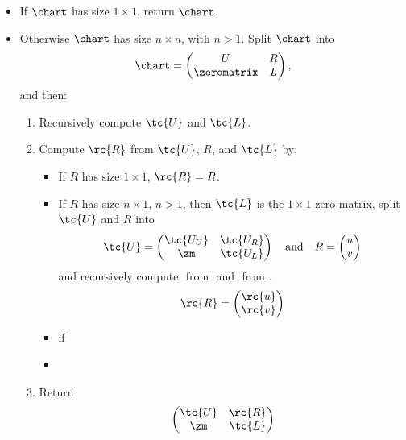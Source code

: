\begin{itemize}
\item If $\chart$ has size $1 \times 1$, return $\chart$.
\item Otherwise $\chart$ has size $n \times n$, with $n > 1$. Split $\chart$ into
  \begin{equation*}
    \chart = 
    \begin{pmatrix}
      U           &  R \\
      \zeromatrix &  L
    \end{pmatrix},
  \end{equation*}
  and then: 
  \begin{enumerate}
  \item Recursively compute $\tc{U}$ and $\tc{L}$.
  \item Compute $\rc{R}$ from $\tc{U}$, $R$, and $\tc{L}$ by:
    \begin{itemize}
    \item If $R$ has size $1 \times 1$, $\rc{R} = R$.
    \item If $R$ has size $n \times 1$, $n > 1$, then $\tc{L}$ is the $1\times 1$ zero matrix, split $\tc{U}$ and $R$ into
      \begin{equation*}
        \tc{U} = 
        \begin{pmatrix}
          \tc{U_U} & \tc{U_R} \\
          \zm      & \tc{U_L} 
        \end{pmatrix} \quad \text{and}\quad
        R = 
        \begin{pmatrix}
          u \\
          v
        \end{pmatrix}
      \end{equation*}
        and recursively compute $ $ from $ $ and $ $ from $ $.
        \begin{equation*}
          \rc{R} = \begin{pmatrix}
            \rc{u}\\
            \rc{v}
          \end{pmatrix}
        \end{equation*}
        \item if  
        \item
    \end{itemize}
    \item Return 
      \begin{equation*}
        \begin{pmatrix}
          \tc{U} & \rc{R} \\
          \zm    & \tc{L}
        \end{pmatrix}
      \end{equation*}
  \end{enumerate}
\end{itemize}

